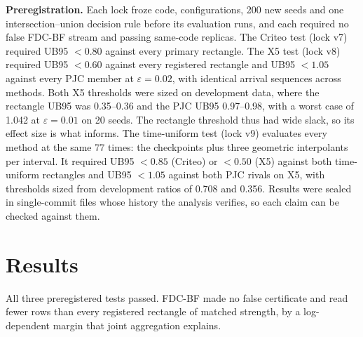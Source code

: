 \documentclass[sigconf,anonymous,review]{acmart}
\newcommand{\eps}{\varepsilon}
\begin{document}
\textbf{Preregistration.} Each lock froze code, configurations, 200 new seeds and one intersection--union decision rule before its evaluation runs, and each required no false FDC-BF stream and passing same-code replicas. The Criteo test (lock v7) required UB95 $< 0.80$ against every primary rectangle. The X5 test (lock v8) required UB95 $< 0.60$ against every registered rectangle and UB95 $< 1.05$ against every PJC member at $\eps = 0.02$, with identical arrival sequences across methods. Both X5 thresholds were sized on development data, where the rectangle UB95 was 0.35--0.36 and the PJC UB95 0.97--0.98, with a worst case of 1.042 at $\eps = 0.01$ on 20 seeds. The rectangle threshold thus had wide slack, so its effect size is what informs. The time-uniform test (lock v9) evaluates every method at the same 77 times: the checkpoints plus three geometric interpolants per interval. It required UB95 $< 0.85$ (Criteo) or $< 0.50$ (X5) against both time-uniform rectangles and UB95 $< 1.05$ against both PJC rivals on X5, with thresholds sized from development ratios of 0.708 and 0.356. Results were sealed in single-commit files whose history the analysis verifies, so each claim can be checked against them.

\section{Results}\label{sec:results}

All three preregistered tests passed. FDC-BF made no false certificate and read fewer rows than every registered rectangle of matched strength, by a log-dependent margin that joint aggregation explains.
\end{document}
